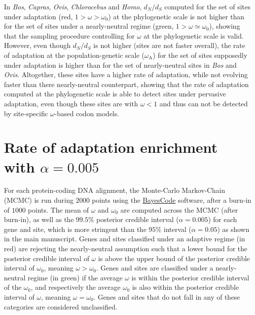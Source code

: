 \documentclass{article}
\renewcommand*{\bm}[1]{#1}%
\newcommand{\dn}{d_N}
\newcommand{\ds}{d_S}
\newcommand{\dnds}{\dn / \ds}
\newcommand{\rateApop}{\omega_{\mathrm{A}}}
\begin{document}
    In \textit{Bos}, \textit{Capras}, \textit{Ovis}, \textit{Chlorocebus} and \textit{Homo}, $\dnds$ computed for the set of sites under adaptation (red, $1 > \omega > \omega_{0}$) at the phylogenetic scale is not higher than for the set of sites under a nearly-neutral regime (green, $1 > \omega \simeq \omega_{0}$), showing that the sampling procedure controlling for $\omega$ at the phylogenetic scale is valid.
    However, even though $\dnds$ is not higher (sites are not faster overall), the rate of adaptation at the population-genetic scale ($\rateApop$) for the set of sites supposedly under adaptation is higher than for the set of nearly-neutral sites in \textit{Bos} and \textit{Ovis}.
    Altogether, these sites have a higher rate of adaptation, while not evolving faster than there nearly-neutral counterpart, showing that the rate of adaptation computed at the phylogenetic scale is able to detect sites under pervasive adaptation, even though these sites are with $\omega < 1$ and thus can not be detected by site-specific $\omega$-based codon models.

    \pagebreak


    \section{Rate of adaptation enrichment with $\bm{\alpha=0.005}$}
    \label{sec:threshold}
    For each protein-coding DNA alignment, the Monte-Carlo Markov-Chain (MCMC) is run during $2000$ points using the \href{https://github.com/bayesiancook/bayescode}{BayesCode} software, after a burn-in of $1000$ points.
    The mean of $\omega$ and $\omega_{0}$ are computed across the MCMC (after burn-in), as well as the $99.5$\% posterior credible interval ($\alpha=0.005$) for each gene and site, which is more stringent than the $95$\% interval ($\alpha=0.05$) as shown in the main manuscript.
    Genes and sites classified under an adaptive regime (in red) are rejecting the nearly-neutral assumption such that a lower bound for the posterior credible interval of $\omega$ is above the upper bound of the posterior credible interval of $\omega_{0}$, meaning $\omega > \omega_{0}$.
    Genes and sites are classified under a nearly-neutral regime (in green) if the average $\omega$ is within the posterior credible interval of the $\omega_{0}$, and respectively the average $\omega_{0}$ is also within the posterior credible interval of  $\omega$, meaning $\omega = \omega_{0}$.
    Genes and sites that do not fall in any of these categories are considered unclassified.
\end{document}
